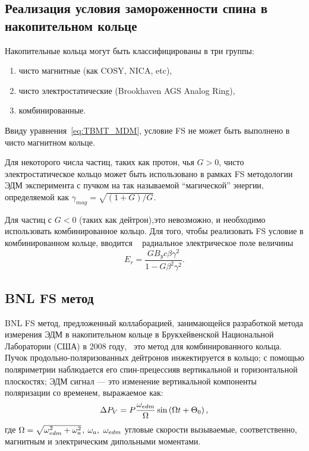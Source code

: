 \documentclass{report}
\begin{document}
\subsection{Реализация условия замороженности спина в накопительном кольце}
Накопительные кольца могут быть классифицированы в три группы:
\begin{enumerate}
\item чисто магнитные (как COSY, NICA, etc),
\item чисто электростатические (Brookhaven AGS Analog Ring),
\item комбинированные.
\end{enumerate}

Ввиду уравнения~\eqref{eq:TBMT_MDM}, условие FS не может быть
выполнено в чисто магнитном кольце.

Для некоторого числа частиц, таких как протон, чья $G>0$, чисто
электростатическое кольцо может быть использовано в рамках FS
методологии ЭДМ эксперимента с пучком на так называемой ``магической''
энергии, определяемой как $\gamma_{mag} = \sqrt{(1+G)/G}$.

Для частиц с $G<0$ (таких как дейтрон),это невозможно, и необходимо
использовать комбинированное кольцо. Для того, чтобы реализовать FS
условие в комбинированном кольце, вводится ~\cite{BNL:Deuteron2008} радиальное электрическое
поле величины
\begin{equation}\label{eq:FS_Er}
  E_r = \frac{GB_yc\beta\gamma^2}{1-G\beta^2\gamma^2}.
\end{equation}

\subsection{BNL FS метод}\label{sec:BNLFS_concept}
BNL FS метод, предложенный коллаборацией, занимающейся разработкой
метода измерения ЭДМ в накопительном кольце в Брукхейвенской
Национальной Лаборатории (США) в 2008 году,~\cite{BNL:Deuteron2008}
это метод для комбинированного кольца. Пучок продольно-поляризованных
дейтронов инжектируется в кольцо; с помощью поляриметрии наблюдается
его спин-прецессияв вертикальной и горизонтальной плоскостях; ЭДМ
сигнал --- это изменение вертикальной компоненты поляризации со
временем, выражаемое как:~\citep[стр.~8]{BNL:Deuteron2008}
\begin{equation}
  \Delta P_V = P\frac{\w_{edm}}{\W}\sin\bkt{\W t + \Theta_0},
\end{equation}
где $\Omega = \sqrt{\omega_{edm}^2 + \omega_a^2}$, $\omega_a,~\omega_{edm}$ угловые
скорости вызываемые, соответственно, магнитным и электрическим
дипольными моментами.
\end{document}
